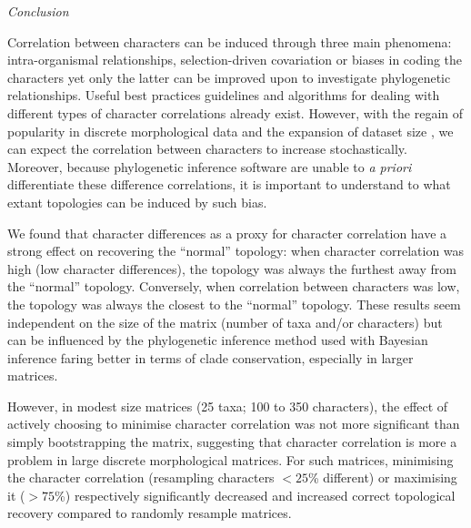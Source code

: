 \documentclass[12pt,letterpaper]{article}
\renewcommand{\subsection}[1]{%
\bigskip
\begin{center}
\begin{large}
\normalfont\itshape #1
\end{large}
\end{center}}
\begin{document}
\subsection{Conclusion}
Correlation between characters can be induced through three main phenomena: intra-organismal relationships, selection-driven covariation or biases in coding the characters yet only the latter can be improved upon to investigate phylogenetic relationships.
Useful best practices guidelines \citep[e.g.][]{Brazeau2011,simoes2017giant} and algorithms for dealing with different types of character correlations \citep[e.g. for characters hierarchy][]{deLaet2015,BrazeauNA} already exist.
However, with the regain of popularity in discrete morphological data and the expansion of dataset size \citep[e.g.][with more than 1000 characters each]{nithe2013,O'Leary08022013}, we can expect the correlation between characters to increase stochastically.
Moreover, because phylogenetic inference software are unable to \textit{a priori} differentiate these difference correlations, it is important to understand to what extant topologies can be induced by such bias.

We found that character differences as a proxy for character correlation have a strong effect on recovering the ``normal'' topology: when character correlation was high (low character differences), the topology was always the furthest away from the ``normal'' topology.
Conversely, when correlation between characters was low, the topology was always the closest to the ``normal'' topology.
These results seem independent on the size of the matrix (number of taxa and/or characters) but can be influenced by the phylogenetic inference method used with Bayesian inference faring better in terms of clade conservation, especially in larger matrices.

However, in modest size matrices (25 taxa; 100 to 350 characters), the effect of actively choosing to minimise character correlation was not more significant than simply bootstrapping the matrix, suggesting that character correlation is more a problem in large discrete morphological matrices.
For such matrices, minimising the character correlation (resampling characters $<25$\% different) or maximising it ($>75$\%) respectively significantly decreased and increased correct topological recovery compared to randomly resample matrices.
\end{document}

